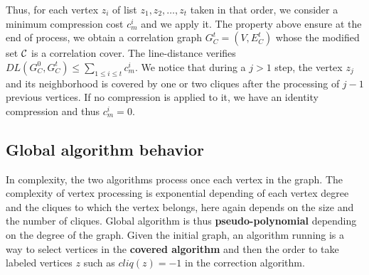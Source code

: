 Thus, for each vertex $z_i$ of list $z_1, z_2, \ldots, z_t$ taken in that order, we consider a minimum compression cost $c_{m}^{i}$ and we apply it.
The property above ensure at the end of process, we obtain a correlation graph $G_{C}^{t} = (V, E_{C}^{t})$ whose the modified set $\cal C$ is a correlation cover.
The line-distance verifies $DL( G_{C}^{0}, G_{C}^{t}) \le \sum_{1 \le i \le t } c_{m}^{i}$.
We notice that during a $j > 1$ step, the vertex $z_{j}$ and its neighborhood is covered by one or two cliques after the processing of $j-1$ previous vertices. If no compression is applied to it, we have an identity compression and thus $c_{m}^{i} = 0$.

\subsection{Global algorithm behavior} 
In complexity, the two algorithms process once each vertex in the graph.
 The complexity of vertex processing is exponential depending of each vertex degree and the cliques to which the vertex belongs, here again depends on the size and the number of cliques. 
Global algorithm is thus {\bf pseudo-polynomial} depending on the degree  of the graph. 
Given the initial graph, an algorithm running  is a way to select vertices in the {\bf covered algorithm} and then the order to take labeled vertices $z$ such as $cliq(z) = -1$ in the correction algorithm.
